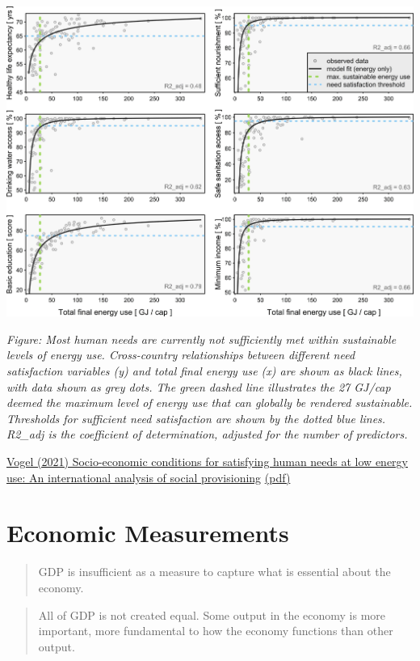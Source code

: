 \documentclass[
]{book}
\begin{document}
\includegraphics{fig/Vogel_fig2.jpg}

\emph{Figure: Most human needs are currently not sufficiently met within sustainable levels of energy use. Cross-country relationships between different need satisfaction
variables (y) and total final energy use (x) are shown as black lines, with data shown as grey dots. The green dashed line illustrates the 27 GJ/cap deemed the
maximum level of energy use that can globally be rendered sustainable. Thresholds for sufficient need satisfaction are shown by the dotted blue
lines. R2\_adj is the coefficient of determination, adjusted for the number of predictors.}

\href{https://www.sciencedirect.com/science/article/pii/S0959378021000662}{Vogel (2021) Socio-economic conditions for satisfying human needs at low energy use: An international analysis of social provisioning}
\href{pdf/Vogel_2021_Social_Provisoning_of_Needs.pdf}{(pdf)}

\hypertarget{economic-measurements}{%
\chapter{Economic Measurements}\label{economic-measurements}}

\begin{quote}
GDP is insufficient as a measure to capture what is essential about the economy.
\end{quote}

\begin{quote}
All of GDP is not created equal. Some output in the economy is more important, more fundamental to how the economy functions than other output.
\end{quote}
\end{document}
